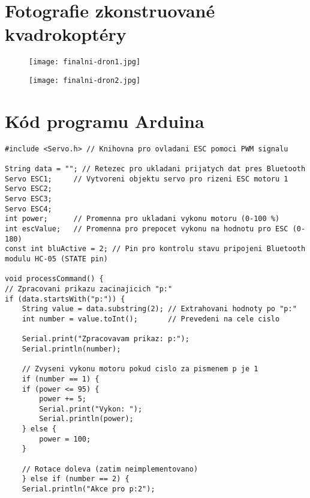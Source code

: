 \documentclass[12pt]{report}
\begin{document}
\nocite{*}
\printbibliography					%
\printglossary[title={Zkratky}]		%
\listoffigures						%

\begin{appendices}
\chapter[Fotografie zkonstruované kvadrokoptéry]{Fotografie zkonstruované kvadrokoptéry}	
\begin{figure}[H]
	\centering
	\texttt{[image: finalni-dron1.jpg]}
\end{figure}
\begin{figure}[H]
	\centering
	\texttt{[image: finalni-dron2.jpg]}
\end{figure}
\chapter[Kód programu Arduina]{Kód programu Arduina}
\begin{lstlisting}[title={}, caption={}, label={}, basicstyle=\footnotesize\ttfamily, inputencoding=utf8]
#include <Servo.h> // Knihovna pro ovladani ESC pomoci PWM signalu

String data = ""; // Retezec pro ukladani prijatych dat pres Bluetooth
Servo ESC1;     // Vytvoreni objektu servo pro rizeni ESC motoru 1
Servo ESC2;
Servo ESC3;
Servo ESC4;
int power;      // Promenna pro ukladani vykonu motoru (0-100 %)
int escValue;   // Promenna pro prepocet vykonu na hodnotu pro ESC (0-180)
const int bluActive = 2; // Pin pro kontrolu stavu pripojeni Bluetooth modulu HC-05 (STATE pin)

void processCommand() {
// Zpracovani prikazu zacinajicich "p:"
if (data.startsWith("p:")) {
	String value = data.substring(2); // Extrahovani hodnoty po "p:"
	int number = value.toInt();       // Prevedeni na cele cislo

	Serial.print("Zpracovavam prikaz: p:");
	Serial.println(number);

	// Zvyseni vykonu motoru pokud cislo za pismenem p je 1
	if (number == 1) {
	if (power <= 95) {
		power += 5;
		Serial.print("Vykon: ");
		Serial.println(power);
	} else {
		power = 100;
	}

	// Rotace doleva (zatim neimplementovano)
	} else if (number == 2) {
	Serial.println("Akce pro p:2");


\end{lstlisting}
\end{appendices}
\end{document}
